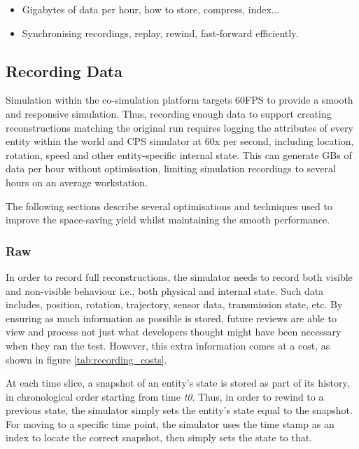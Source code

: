 \begin{itemize}
  \item Gigabytes of data per hour, how to store, compress, index...
  \item Synchronising recordings, replay, rewind, fast-forward efficiently.
\end{itemize}

\subsection{Recording Data} %
\label{sub:recording_data}
Simulation within the co-simulation platform targets 60FPS to provide a smooth and responsive simulation. Thus, recording enough data to support creating reconstructions matching the original run requires logging the attributes of every entity within the world and CPS simulator at 60x per second, including location, rotation, speed and other entity-specific internal state. This can generate GBs of data per hour without optimisation, limiting simulation recordings to several hours on an average workstation.

The following sections describe several optimisations and techniques used to improve the space-saving yield whilst maintaining the smooth performance.
\subsubsection{Raw} %
\label{sub:raw}
In order to record full reconstructions, the simulator needs to record both visible and non-visible behaviour i.e., both physical and internal state. Such data includes, position, rotation, trajectory, sensor data, transmission state, etc. By ensuring as much information as possible is stored, future reviews are able to view and process not just what developers thought might have been necessary when they ran the test. However, this extra information comes at a cost, as shown in figure \ref{tab:recording_costs}.

At each time slice, a snapshot of an entity's state is stored as part of its history, in chronological order starting from time \textit{t0}. Thus, in order to rewind to a previous state, the simulator simply sets the entity's state equal to the snapshot. For moving to a specific time point, the simulator uses the time stamp as an index to locate the correct snapshot, then simply sets the state to that.

